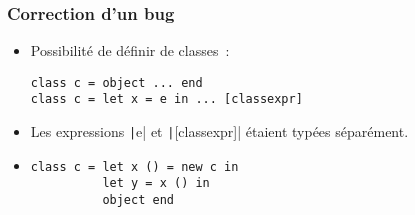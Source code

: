 \documentclass{beamer}
\newcommand{\backupend}{
   \setcounter{framenumber}{\value{finalframe}}
}
\begin{document}
\begin{frame}[fragile]
  \frametitle{Correction d'un bug}
  \begin{itemize}
    \item<1-> Possibilité de définir de classes :
      \begin{verbatim}
class c = object ... end
class c = let x = e in ... [classexpr]
      \end{verbatim}
    \item<2-> Les expressions \texttt|e| et
      \texttt|[classexpr]| étaient typées séparément.
    \item<3-> 
      \begin{verbatim}
class c = let x () = new c in
          let y = x () in
          object end
      \end{verbatim}
  \end{itemize}
\end{frame}

\backupend
\end{document}
